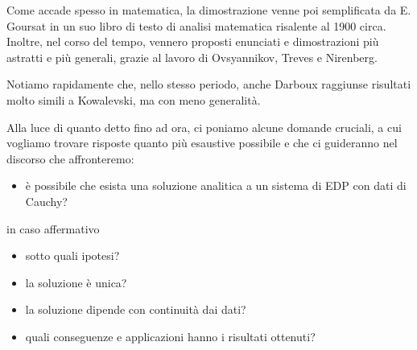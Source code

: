 \newpage
Come accade spesso in matematica, la dimostrazione venne poi semplificata da E. Goursat in un suo libro di testo di analisi matematica risalente al 1900 circa. Inoltre, nel corso del tempo, vennero proposti enunciati e dimostrazioni più astratti e più generali, grazie al lavoro di Ovsyannikov, Treves e Nirenberg.

Notiamo rapidamente che, nello stesso periodo, anche Darboux raggiunse risultati molto simili a Kowalevski, ma con meno generalità.

Alla luce di quanto detto fino ad ora, ci poniamo alcune domande cruciali, a cui vogliamo trovare risposte quanto più esaustive possibile e che ci guideranno nel discorso che affronteremo:
\begin{itemize}
\item è possibile che esista una soluzione analitica a un sistema di EDP con dati di Cauchy?
\end{itemize}
in caso affermativo
\begin{itemize}
\item sotto quali ipotesi?
\item la soluzione è unica?
\item la soluzione dipende con continuità dai dati?
\item quali conseguenze e applicazioni hanno i risultati ottenuti?
\end{itemize}



